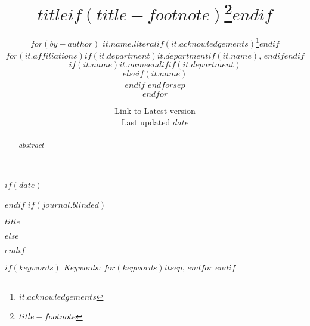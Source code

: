 \def\spacingset#1{\renewcommand{\baselinestretch}%
{#1}\small\normalsize} \spacingset{1}



$if(date)$
\date{\href{https://hchulkim.github.io}{Link to Latest version}\\ \vspace{1em} Last updated $date$}
$endif$
$if(journal.blinded)$
\spacingset{.8}
\bigskip
\bigskip
\bigskip
\begin{center}
  {\LARGE $title$}
\end{center}
\smallskip
\bigskip
\spacingset{1}
$else$
\title{$title$$if(title-footnote)$\thanks{$title-footnote$}$endif$}
\author{
$for(by-author)$
$it.name.literal$$if(it.acknowledgements)$\thanks{$it.acknowledgements$}$endif$\\
$for(it.affiliations)$$if(it.department)$$it.department$$if(it.name)$, $endif$$endif$$if(it.name)$$it.name$$endif$$if(it.department)$\\$elseif(it.name)$\\$endif$
$endfor$$sep$\\$endfor$}
\maketitle
$endif$

\bigskip
\bigskip
\begin{abstract}
$abstract$
\end{abstract}

\bigskip
$if(keywords)$
\noindent%
{\it Keywords:} $for(keywords)$$it$$sep$, $endfor$
\vfill
$endif$

\newpage
\spacingset{1.2} %